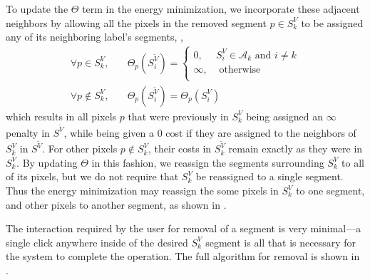 \documentclass[]{spie}  %
\begin{document}
To update the $\Theta$ term in the energy minimization, we incorporate
these adjacent neighbors by allowing all the pixels in the removed
segment $p\in S^V_k$ to be assigned any of its neighboring label's
segments, \ie,
\begin{equation}\label{eq:remove}
\begin{aligned}
 \forall p \in S^V_k ,& \quad \Theta_p(S^{\tilde{V}}_i) = \left\{
   \begin{array}{lcr}
     0, & S^V_i \in \mathcal{A}_k \textrm{ and } i \neq k  \\
     \infty, & \textrm{ otherwise} \\
   \end{array}
 \right. \\
\forall p \notin S^V_k ,& \quad \Theta_p(S^{\tilde{V}}_i) = \Theta_p(S^V_i)
\end{aligned}
\end{equation}
which results in all pixels $p$ that were previously in $S^V_k$ being
assigned an $\infty$ penalty in $S^{\tilde{V}}$, while being given a
$0$ cost if they are assigned to the neighbors of $S^V_k$ in
$S^{\tilde{V}}$.  For other pixels $p\notin S^V_k$, their costs in
$S^{\tilde{V}}_k$ remain exactly as they were in $S^V_k$.  By updating
$\Theta$ in this fashion, we reassign the segments surrounding $S^V_k$
to all of its pixels, but we do not require that $S^V_k$ be reassigned
to a single segment.  Thus the energy minimization may reassign the
some pixels in $S^V_k$ to one segment, and other pixels to another
segment, as shown in .

The interaction required by the user for removal of a segment is very
minimal---a single click anywhere inside of the desired $S^V_k$
segment is all that is necessary for the system to complete the
operation.  The full algorithm for removal is shown in .
\end{document}
